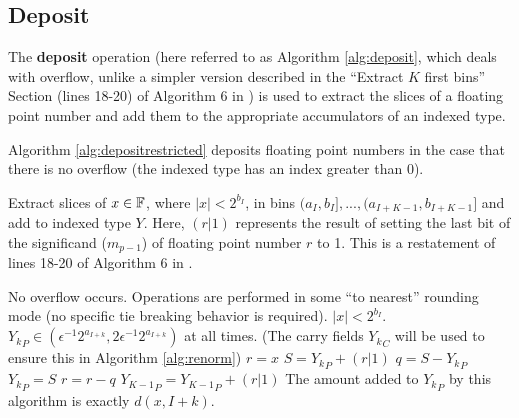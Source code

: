 \subsection{Deposit}
    \label{sec:primitiveops_deposit}
    The \textbf{deposit} operation (here referred to as Algorithm \ref{alg:deposit},
    which deals with overflow, unlike a simpler version described in the
    ``Extract $K$ first bins'' Section (lines 18-20) of Algorithm $6$ in
    \cite{repsum}) is used to extract the slices of a floating point number and
    add them to the appropriate accumulators of an indexed type.

    Algorithm \ref{alg:depositrestricted} deposits floating point numbers in
    the case that there is no overflow (the indexed type has an index greater
    than 0).

      \begin{samepage}
      \begin{alg}
        Extract slices of $x \in \mathbb{F}$, where $|x| < 2^{b_I}$, in bins $(a_I,
        b_I], ..., (a_{I + K - 1}, b_{I + K - 1}]$ and add to indexed type $Y$.
        Here, $(r | 1)$ represents the result of setting the last bit of the
        significand ($m_{p - 1}$) of floating point number $r$ to 1. This is a
        restatement of lines 18-20 of Algorithm $6$ in \cite{repsum}.
        \begin{algorithmic}[1]
          \Require
          \Statex No overflow occurs.
          \Statex Operations are performed in some ``to nearest'' rounding mode
          (no specific tie breaking behavior is required).
          \Statex $|x| < 2^{b_I}$.
          \Statex ${Y_k}_P \in (\epsilon^{-1}  2^{a_{I + k}}, 2  \epsilon^{-1}  2^{a_{I + k}})$ at all times.
          (The carry fields ${Y_k}_C$ will be used to ensure this in Algorithm \ref{alg:renorm})
            \State $r = x$ \label{alg:depositrestricted:rgetsx}
             \label{alg:depositrestricted:loop}
              \State $S = {Y_k}_P + (r | 1)$ \label{alg:depositrestricted:split}
              \State $q = S - {Y_k}_P$
              \State ${Y_k}_P = S$
              \State $r = r - q$\label{alg:depositrestricted:endsplit}
            \EndFor
            \State ${Y_{K - 1}}_P = {Y_{K - 1}}_P + (r | 1)$
          \EndFunction
          \Ensure
          \Statex The amount added to ${Y_k}_P$ by this algorithm is exactly $d(x, I + k)$.
        \end{algorithmic}
        \label{alg:depositrestricted}
      \end{alg}
      \end{samepage}

